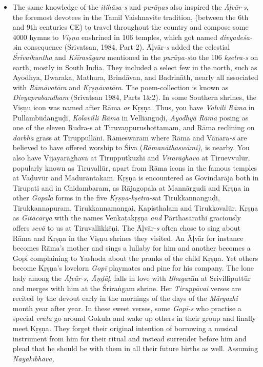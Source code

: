 \begin{itemize}
\item The same knowledge of the \textit{itihāsa-s} and \textit{purāņas} also inspired the \textit{Āļvār-s}, the foremost devotees in the Tamil Vaishnavite tradition, (between the 6th and 9th centuries CE) to travel throughout the country and compose some 4000 hymns to \textit{Viṣṇu} enshrined in 106 temples, which got named \textit{divyadeśa-s}\break in consequence (Srivatsan, 1984, Part 2). Āļvār\textit{-s} added the celestial \textit{Śrivaikuntha} and \textit{Kśīrasāgara} mentioned in the \textit{purāṇa-s}\break to the 106 \textit{kṣetra-s} on earth, mostly in South India. They included a select few in the north, such as Ayodhya, Dwaraka, Mathura, Brindāvan, and Badrināth, nearly all associated with \textit{Rāmāvatāra} and \textit{Kṛṣṇāvatāra}. The poem-collection is known as \textit{Divyaprabandham} (Srivatsan 1984, Parts 1\&2). In some Southern shrines, the Viṣṇu icon was named after Rāma\textit{ or} Kṛṣṇa. Thus, you have \textit{Valvili Rāma} in Pullambūdanguḍi, \textit{Kolavilli Rāma} in Vellianguḍi\textit{, Ayodhyā Rāma} posing as one of the eleven Rudra-s at Tiruvaṇpurushottamam, and Rāma reclining on \textit{darbha} grass at Tiruppullāni. Rāmeswaram where Rāma and Vānara\textit{-s} are believed to have offered worship to Śiva (\textit{Rāmanāthaswāmi),} is nearby. You also have Vijayarāghava at Tirupputkuzhi and \textit{Vīrarāghava} at Tiruevvulūr, popularly known as Tiruvallūr, apart from Rāma icons in the famous temples at Vaḍuvūr and Madurāntakam. Kṛṣṇa is encountered as Govindarāja both in Tirupati and in Chidambaram, as Rājagopala at Mannārgudi and Kṛṣṇa in other \textit{Gopala} forms in the five \textit{Kṛṣṇa-kṣetra-s}\break at Tirukkannanguḍi, Tirukkannapuram, Tirukkannamangai, Kapisthalam and Tirukkovalūr. Kṛṣṇa as \textit{Gītācārya} with the names Venkaṭakṛṣṇa\textit{ and} Pārthasārathi graciously offers \textit{sevā} to us at Tiruvallikkēṇi. The Āļvār-\textit{s} often chose to sing about Rāma and Kṛṣṇa in the Viṣṇu shrines they visited\textit{.} An Āļvār for instance becomes Rāma’s mother and sings a lullaby for him and another becomes a Gopi complaining to Yashoda about the pranks of the child Kṛṣṇa. Yet others become Kṛṣṇa’s lovelorn \textit{Gopī} playmates and pine for his company. The lone lady among the \textit{Āļvār-s, Āṇḍāḷ}, falls in love with \textit{Bhagav}ān at Srivilliputtūr and merges with him at the Śriraṅgam shrine. Her \textit{Tiruppāvai} verses are recited by the devout early in the mornings of the days of the \textit{Mārgazhi} month year after year. In these sweet verses, some \textit{Gopī-s} who practise a special \textit{vrata} go around Gokula and wake up others in their group and finally meet Kṛṣṇa\textit{.} They forget their original intention of borrowing a musical instrument from him for their ritual and instead surrender before him and plead that he should be with them in all their future births as well. Assuming \textit{Nāyakībhāva,} 
\end{itemize}
